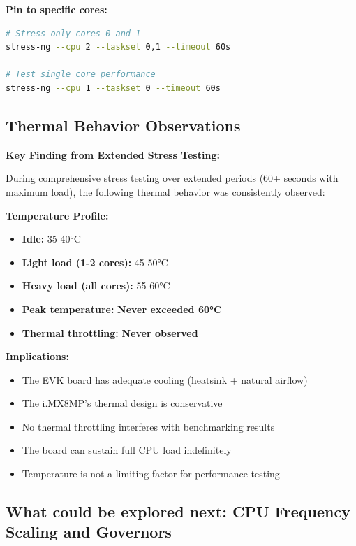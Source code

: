 \documentclass[12pt,a4paper]{report}
\begin{document}
\textbf{Pin to specific cores:}
\begin{lstlisting}[language=bash]
# Stress only cores 0 and 1
stress-ng --cpu 2 --taskset 0,1 --timeout 60s

# Test single core performance
stress-ng --cpu 1 --taskset 0 --timeout 60s
\end{lstlisting}

\subsection{Thermal Behavior Observations}

\begin{important}
\textbf{Key Finding from Extended Stress Testing:}

During comprehensive stress testing over extended periods (60+ seconds with maximum load), the following thermal behavior was consistently observed:

\textbf{Temperature Profile:}
\begin{itemize}
    \item \textbf{Idle:} 35-40°C
    \item \textbf{Light load (1-2 cores):} 45-50°C
    \item \textbf{Heavy load (all cores):} 55-60°C
    \item \textbf{Peak temperature:} \textbf{Never exceeded 60°C}
    \item \textbf{Thermal throttling:} \textbf{Never observed}
\end{itemize}

\textbf{Implications:}
\begin{itemize}
    \item The EVK board has adequate cooling (heatsink + natural airflow)
    \item The i.MX8MP's thermal design is conservative
    \item No thermal throttling interferes with benchmarking results
    \item The board can sustain full CPU load indefinitely
    \item Temperature is not a limiting factor for performance testing
\end{itemize}


\end{important}


\subsection{What could be explored next: CPU Frequency Scaling and Governors}
\end{document}
